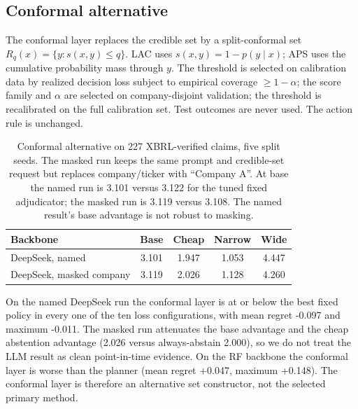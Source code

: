 \documentclass[11pt]{article}
\begin{document}
\subsection{Conformal alternative}
\label{app:conformal}
The conformal layer replaces the credible set by a split-conformal set
\(R_q(x)=\{y:s(x,y)\le q\}\). LAC uses \(s(x,y)=1-p(y\mid x)\); APS uses the
cumulative probability mass through \(y\). The threshold is selected on
calibration data by realized decision loss subject to empirical coverage
\(\ge 1-\alpha\); the score family and \(\alpha\) are selected on
company-disjoint validation; the threshold is recalibrated on the full
calibration set. Test outcomes are never used. The action rule is unchanged.

\begin{table}[t]
\centering
\small
\setlength{\tabcolsep}{2pt}
\begin{tabular}{lcccc}
\toprule
Backbone & Base & Cheap & Narrow & Wide \\
\midrule
DeepSeek, named & 3.101 & 1.947 & 1.053 & 4.447 \\
DeepSeek, masked company & 3.119 & 2.026 & 1.128 & 4.260 \\
\bottomrule
\end{tabular}
\caption{Conformal alternative on 227 XBRL-verified claims, five split seeds. The masked run keeps the same prompt and credible-set request but replaces company/ticker with ``Company A''. At base the named run is 3.101 versus 3.122 for the tuned fixed adjudicator; the masked run is 3.119 versus 3.108. The named result's base advantage is not robust to masking.}
\label{tab:conformal}
\end{table}

On the named DeepSeek run the conformal layer is at or below the best fixed
policy in every one of the ten loss configurations, with mean regret -0.097
and maximum -0.011. The masked run attenuates the base advantage and the cheap
abstention advantage (2.026 versus always-abstain 2.000), so we do not treat
the LLM result as clean point-in-time evidence. On the RF backbone the
conformal layer is worse than the planner (mean regret +0.047, maximum +0.148).
The conformal layer is therefore an alternative set constructor, not the
selected primary method.
\end{document}
